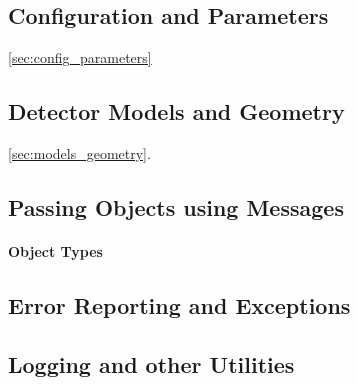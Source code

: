 \subsection{Configuration and Parameters}
\ref{sec:config_parameters}
\subsection{Detector Models and Geometry}
\ref{sec:models_geometry}.
\subsection{Passing Objects using Messages}
\label{sec:objects_messages}
\paragraph{Object Types}
\subsection{Error Reporting and Exceptions}
\subsection{Logging and other Utilities}
\label{sec:logging_utilities}
